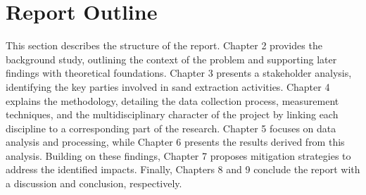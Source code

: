 \section{Report Outline}
\label{section: report outline}
This section describes the structure of the report. Chapter 2 provides the background study, outlining the context of the problem and supporting later findings with theoretical foundations. Chapter 3 presents a stakeholder analysis, identifying the key parties involved in sand extraction activities. Chapter 4 explains the methodology, detailing the data collection process, measurement techniques, and the multidisciplinary character of the project by linking each discipline to a corresponding part of the research. Chapter 5 focuses on data analysis and processing, while Chapter 6 presents the results derived from this analysis. Building on these findings, Chapter 7 proposes mitigation strategies to address the identified impacts. Finally, Chapters 8 and 9 conclude the report with a discussion and conclusion, respectively.











